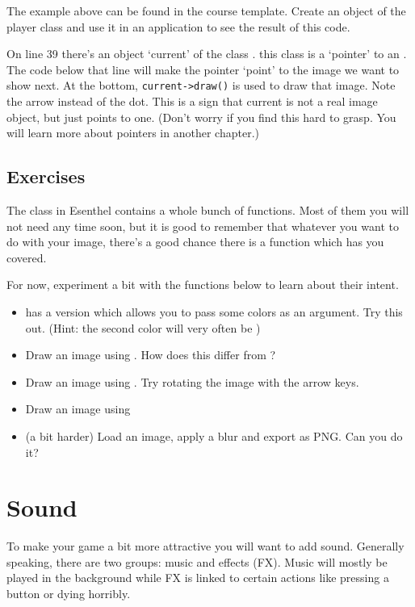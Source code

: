 \begin{exercise}
The example above can be found in the course template. Create an object of the player class and use it in an application to see the result of this code.
\end{exercise}

\begin{note}
On line 39 there's an object `current' of the class . this class is a `pointer' to an . The code below that line will make the pointer `point' to the image we want to show next. At the bottom, \verb|current->draw()| is used to draw that image. Note the arrow instead of the dot. This is a sign that current is not a real image object, but just points to one. (Don't worry if you find this hard to grasp. You will learn more about pointers in another chapter.)
\end{note}

\subsection{Exercises}
The  class in Esenthel contains a whole bunch of functions. Most of them you will not need any time soon, but it is good to remember that whatever you want to do with your image, there's a good chance there is a function which has you covered.

For now, experiment a bit with the functions below to learn about their intent.

\begin{itemize}
\item {} has a version which allows you to pass some colors as an argument. Try this out. (Hint: the second color will very often be )
\item Draw an image using . How does this differ from ?
\item Draw an image using . Try rotating the image with the arrow keys.
\item Draw an image using 
\item (a bit harder) Load an image, apply a blur and export as PNG. Can you do it?
\end{itemize}

\section{Sound}
To make your game a bit more attractive you will want to add sound. Generally speaking, there are two groups: music and effects (FX). Music will mostly be played in the background while FX is linked to certain actions like pressing a button or dying horribly.

